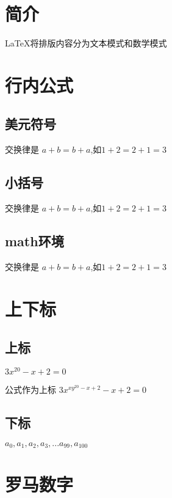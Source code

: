 \documentclass{ctexart}
\newcommand{\rmnum}[1]{\romannumeral #1}
\begin{document}
    \section{简介}
    \LaTeX 将排版内容分为文本模式和数学模式

        \section{行内公式}
        \subsection{美元符号}
        交换律是 $a+b=b+a$,如$1+2=2+1=3$
        \subsection{小括号}
        交换律是 \(a+b=b+a\),如\(1+2=2+1=3\)
        \subsection{math环境}
        交换律是 \begin{math}a+b=b+a\end{math},如\begin{math}1+2=2+1=3\end{math}

        \section{上下标}

        \subsection{上标}
        $3x^{20} - x + 2 = 0$
        
        公式作为上标
        $3x^{xy^{20}-x+2} - x + 2 = 0$

        \subsection{下标}
        $a_0,a_1,a_2,a_3, ... a_{99},a_{100}$

        \section{罗马数字}
        \rmnum{1}
        
        \rmnum{2} 
        
        \rmnum{3}
        
\end{document}
